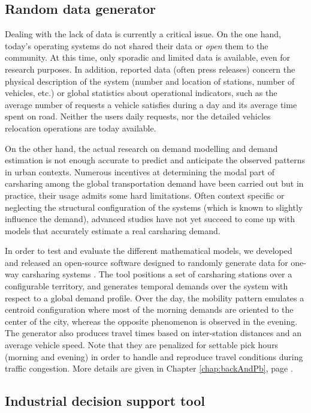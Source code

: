 \subsection{Random data generator}
Dealing with the lack of data is currently a critical issue. %
On the one hand, today's operating systems do not shared their data or \emph{open} them to the community.
At this time, only sporadic and limited data is available, even for research purposes.
In addition, reported data (often press releases) concern the physical description of the system (number and location of stations, number of vehicles, etc.) or global statistics about operational indicators, such as the average number of requests a vehicle satisfies during a day and its average time spent on road.
Neither the users daily requests, nor the detailed vehicles relocation operations are today available.

On the other hand, the actual research on demand modelling and demand estimation is not enough accurate to predict and anticipate the observed patterns in urban contexts.
Numerous incentives at determining the modal part of carsharing among the global transportation demand have been carried out but in practice, their usage admits some hard limitations.
Often context specific or neglecting the structural configuration of the systems (which is known to slightly influence the demand), advanced studies have not yet succeed to come up with models that accurately estimate a real carsharing demand.

\medskip
In order to test and evaluate the different mathematical models, we developed and released an open-source software designed to randomly generate data for one-way carsharing systems \cite{csgen}.
The tool positions a set of carsharing stations over a configurable territory, and generates temporal demands over the system with respect to a global demand profile.
Over the day, the mobility pattern emulates a centroid configuration where most of the morning demands are oriented to the center of the city, whereas the opposite phenomenon is observed in the evening.
The generator also produces travel times based on inter-station distances and an average vehicle speed.
Note that they are penalized for settable pick hours (morning and evening) in order to handle and reproduce travel conditions during traffic congestion.
More details are given in Chapter \ref{chap:backAndPb}, page \pageref{csgeneratorDescription}.


\subsection{Industrial decision support tool}

